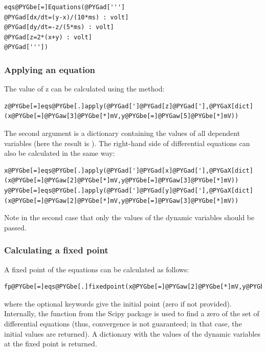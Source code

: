 \documentclass[letterpaper,10pt,english]{manual}
\begin{document}
\begin{Verbatim}[commandchars=@\[\]]
eqs@PYGbe[=]Equations(@PYGad[''']
@PYGad[dx/dt=(y-x)/(10*ms) : volt]
@PYGad[dy/dt=-z/(5*ms) : volt]
@PYGad[z=2*(x+y) : volt]
@PYGad['''])
\end{Verbatim}

\hypertarget{index-17}{}\subsubsection{Applying an equation}

The value of z can be calculated using the  method:

\begin{Verbatim}[commandchars=@\[\]]
z@PYGbe[=]eqs@PYGbe[.]apply(@PYGad[']@PYGad[z]@PYGad['],@PYGaX[dict](x@PYGbe[=]@PYGaw[3]@PYGbe[*]mV,y@PYGbe[=]@PYGaw[5]@PYGbe[*]mV))
\end{Verbatim}

The second argument is a dictionary containing the values of all dependent variables
(here the result is ).
The right-hand side of differential equations can also be calculated in the same way:

\begin{Verbatim}[commandchars=@\[\]]
x@PYGbe[=]eqs@PYGbe[.]apply(@PYGad[']@PYGad[x]@PYGad['],@PYGaX[dict](x@PYGbe[=]@PYGaw[2]@PYGbe[*]mV,y@PYGbe[=]@PYGaw[3]@PYGbe[*]mV))
y@PYGbe[=]eqs@PYGbe[.]apply(@PYGad[']@PYGad[y]@PYGad['],@PYGaX[dict](x@PYGbe[=]@PYGaw[2]@PYGbe[*]mV,y@PYGbe[=]@PYGaw[3]@PYGbe[*]mV))
\end{Verbatim}

Note in the second case that only the values of the dynamic variables should be passed.

\subsubsection{Calculating a fixed point}

A fixed point of the equations can be calculated as follows:

\begin{Verbatim}[commandchars=@\[\]]
fp@PYGbe[=]eqs@PYGbe[.]fixedpoint(x@PYGbe[=]@PYGaw[2]@PYGbe[*]mV,y@PYGbe[=]@PYGaw[3]@PYGbe[*]mV)
\end{Verbatim}

where the optional keywords give the initial point (zero if not provided).
Internally, the function  from the Scipy package is used to
find a zero of the set of differential equations (thus, convergence is not
guaranteed; in that case, the initial values are returned).
A dictionary with the values of the dynamic variables at the fixed point is returned.
\end{document}
